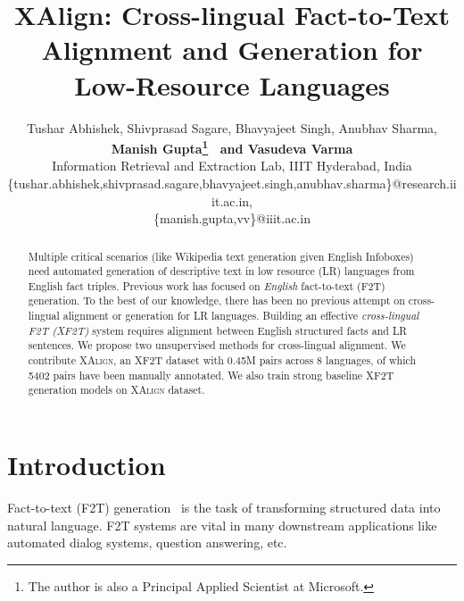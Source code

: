 \documentclass[11pt]{article}
\title{XAlign: Cross-lingual Fact-to-Text Alignment and Generation for Low-Resource Languages}
\author{Tushar Abhishek, Shivprasad Sagare, Bhavyajeet Singh, Anubhav Sharma,\\ {\bf Manish Gupta\thanks{The
author is also a Principal Applied Scientist at Microsoft.}~ and Vasudeva Varma} \\ Information Retrieval and Extraction Lab, IIIT Hyderabad, India \\ \{tushar.abhishek,shivprasad.sagare,bhavyajeet.singh,anubhav.sharma\}@research.iiit.ac.in,\\ \{manish.gupta,vv\}@iiit.ac.in}
\def\langCount{8}
\def\goldenCount{5402} %
\def\totalDataCount{0.45M}
\begin{document}
\maketitle
\begin{abstract}
Multiple critical scenarios (like Wikipedia text generation given English Infoboxes) need automated generation of descriptive text in low resource (LR) languages from English fact triples. Previous work has focused on \emph{English} fact-to-text (F2T) generation. To the best of our knowledge, there has been no previous attempt on cross-lingual alignment or generation for LR languages. 
Building an effective \emph{cross-lingual F2T (XF2T)} system requires alignment between English structured facts and LR sentences.  %
We propose two unsupervised methods for cross-lingual alignment. We contribute \textsc{XAlign}, an XF2T dataset with \totalDataCount{} pairs across \langCount{} languages, of which \goldenCount{} pairs have been manually annotated.
We also train strong baseline XF2T generation models on \textsc{XAlign} dataset.  %
\end{abstract}

\section{Introduction}
Fact-to-text (F2T) generation~\cite{reiter1997building} is the task of transforming structured data into natural language. F2T systems are vital in many downstream applications like automated dialog systems, question answering, etc.
\end{document}
